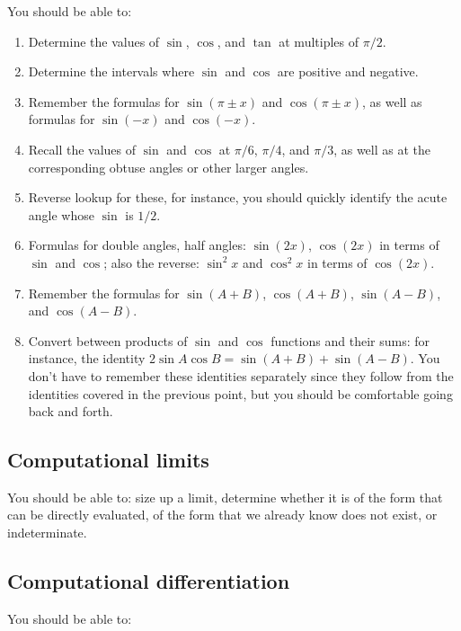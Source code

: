 \documentclass[10pt]{amsart}
\begin{document}
You should be able to:

\begin{enumerate}
\item Determine the values of $\sin$, $\cos$, and $\tan$ at multiples
  of $\pi/2$.
\item Determine the intervals where $\sin$ and $\cos$ are positive and
  negative.
\item Remember the formulas for $\sin(\pi \pm x )$ and $\cos(\pi \pm x)$,
  as well as formulas for $\sin(-x)$ and $\cos(-x)$.
\item Recall the values of $\sin$ and $\cos$ at $\pi/6$, $\pi/4$, and
  $\pi/3$, as well as at the corresponding obtuse angles or other
  larger angles.
\item Reverse lookup for these, for instance, you should quickly
  identify the acute angle whose $\sin$ is $1/2$.
\item Formulas for double angles, half angles: $\sin(2x)$, $\cos(2x)$
  in terms of $\sin$ and $\cos$; also the reverse: $\sin^2x$ and
  $\cos^2x$ in terms of $\cos(2x)$.
\item Remember the formulas for $\sin(A + B)$, $\cos(A + B)$, $\sin(A
  - B)$, and $\cos(A - B)$.
\item Convert between products of $\sin$ and $\cos$ functions and
  their sums: for instance, the identity $2\sin A \cos B = \sin(A + B)
  + \sin (A - B)$. You don't have to remember these identities
  separately since they follow from the identities covered in the
  previous point, but you should be comfortable going back and forth.
\end{enumerate}

\subsection{Computational limits}

You should be able to: size up a limit, determine whether it is of the
form that can be directly evaluated, of the form that we already know
does not exist, or indeterminate.

\subsection{Computational differentiation}

You should be able to:
\end{document}
